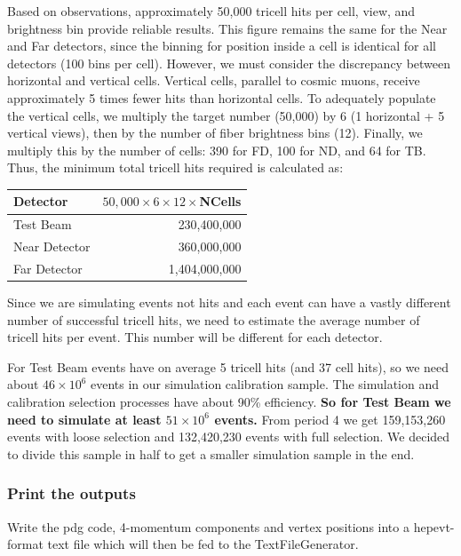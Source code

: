 \documentclass[12pt]{article}
\begin{document}
Based on observations, approximately 50,000 tricell hits per cell, view, and brightness bin provide reliable results. This figure remains the same for the Near and Far detectors, since the binning for position inside a cell is identical for all detectors (100 bins per cell). However, we must consider the discrepancy between horizontal and vertical cells. Vertical cells, parallel to cosmic muons, receive approximately 5 times fewer hits than horizontal cells. To adequately populate the vertical cells, we multiply the target number (50,000) by 6 (1 horizontal + 5 vertical views), then by the number of fiber brightness bins (12). Finally, we multiply this by the number of cells: 390 for FD, 100 for ND, and 64 for TB. Thus, the minimum total tricell hits required is calculated as:
\begin{center}
\begin{tabular}{lr}
Detector & $50,000\times 6\times 12\times$NCells\\\hline
Test Beam & 230,400,000\\
Near Detector & 360,000,000\\
Far Detector & 1,404,000,000
\end{tabular}
\end{center}

Since we are simulating events not hits and each event can have a vastly different number of successful tricell hits, we need to estimate the average number of tricell hits per event. This number will be different for each detector.

For Test Beam events have on average 5 tricell hits (and 37 cell hits), so we need about $46\times 10^6$ events in our simulation calibration sample. The simulation and calibration selection processes have about 90\% efficiency. \textbf{So for Test Beam we need to simulate at least $51\times10^6$ events.} From period 4 we get 159,153,260 events with loose selection and 132,420,230 events with full selection. We decided to divide this sample in half to get a smaller simulation sample in the end.

\subsubsection{Print the outputs}
Write the pdg code, 4-momentum components and vertex positions into a hepevt-format text file which will then be fed to the TextFileGenerator.
\end{document}
